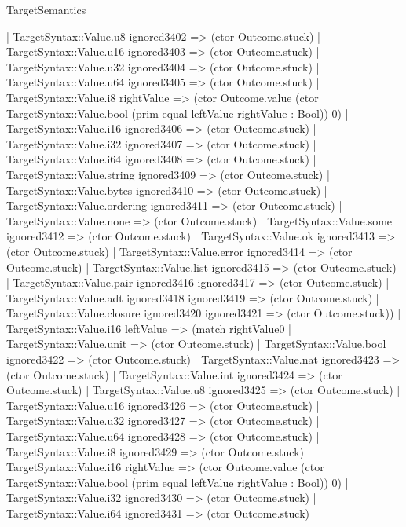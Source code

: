 \begin{lexlean}{TargetSemantics}
\begin{semanticmodule}
{              | TargetSyntax::Value.u8 ignored3402 => (ctor Outcome.stuck)
              | TargetSyntax::Value.u16 ignored3403 => (ctor Outcome.stuck)
              | TargetSyntax::Value.u32 ignored3404 => (ctor Outcome.stuck)
              | TargetSyntax::Value.u64 ignored3405 => (ctor Outcome.stuck)
              | TargetSyntax::Value.i8 rightValue => (ctor Outcome.value (ctor TargetSyntax::Value.bool (prim equal leftValue rightValue : Bool)) 0)
              | TargetSyntax::Value.i16 ignored3406 => (ctor Outcome.stuck)
              | TargetSyntax::Value.i32 ignored3407 => (ctor Outcome.stuck)
              | TargetSyntax::Value.i64 ignored3408 => (ctor Outcome.stuck)
              | TargetSyntax::Value.string ignored3409 => (ctor Outcome.stuck)
              | TargetSyntax::Value.bytes ignored3410 => (ctor Outcome.stuck)
              | TargetSyntax::Value.ordering ignored3411 => (ctor Outcome.stuck)
              | TargetSyntax::Value.none => (ctor Outcome.stuck)
              | TargetSyntax::Value.some ignored3412 => (ctor Outcome.stuck)
              | TargetSyntax::Value.ok ignored3413 => (ctor Outcome.stuck)
              | TargetSyntax::Value.error ignored3414 => (ctor Outcome.stuck)
              | TargetSyntax::Value.list ignored3415 => (ctor Outcome.stuck)
              | TargetSyntax::Value.pair ignored3416 ignored3417 => (ctor Outcome.stuck)
              | TargetSyntax::Value.adt ignored3418 ignored3419 => (ctor Outcome.stuck)
              | TargetSyntax::Value.closure ignored3420 ignored3421 => (ctor Outcome.stuck))
            | TargetSyntax::Value.i16 leftValue => (match rightValue0
              | TargetSyntax::Value.unit => (ctor Outcome.stuck)
              | TargetSyntax::Value.bool ignored3422 => (ctor Outcome.stuck)
              | TargetSyntax::Value.nat ignored3423 => (ctor Outcome.stuck)
              | TargetSyntax::Value.int ignored3424 => (ctor Outcome.stuck)
              | TargetSyntax::Value.u8 ignored3425 => (ctor Outcome.stuck)
              | TargetSyntax::Value.u16 ignored3426 => (ctor Outcome.stuck)
              | TargetSyntax::Value.u32 ignored3427 => (ctor Outcome.stuck)
              | TargetSyntax::Value.u64 ignored3428 => (ctor Outcome.stuck)
              | TargetSyntax::Value.i8 ignored3429 => (ctor Outcome.stuck)
              | TargetSyntax::Value.i16 rightValue => (ctor Outcome.value (ctor TargetSyntax::Value.bool (prim equal leftValue rightValue : Bool)) 0)
              | TargetSyntax::Value.i32 ignored3430 => (ctor Outcome.stuck)
              | TargetSyntax::Value.i64 ignored3431 => (ctor Outcome.stuck)
}
\end{semanticmodule}
\end{lexlean}
